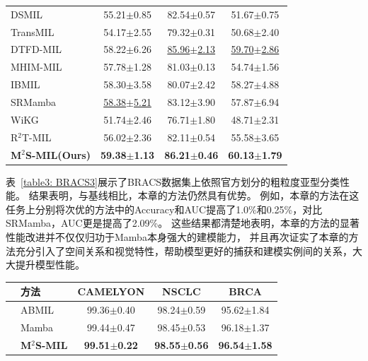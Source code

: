 {\begin{xltabular}{\textwidth}{XCCC}
  DSMIL~\cite{li2021dual}          & 55.21$\pm$0.85 & 82.54$\pm$0.57 & 51.67$\pm$0.75\\
  TransMIL~\cite{shao2021transmil} & 54.17$\pm$2.55 & 79.32$\pm$0.31 & 50.68$\pm$2.40  \\
  DTFD-MIL~\cite{zhang2022dtfd}    & 58.22$\pm$6.26 &\underline{85.96$\pm$2.13} &\underline{59.70$\pm$2.86} \\
  MHIM-MIL~\cite{tang2023multiple}    &57.78$\pm$1.28 & 81.03$\pm$0.13 &54.74$\pm$1.56 \\
  IBMIL~\cite{lin2023interventional}    & 58.30$\pm$3.58 & 80.07$\pm$2.42 & 58.27$\pm$4.88\\
  SRMamba ~\cite{yang2024mambamil}& \underline{58.38$\pm$5.21}&83.12$\pm$3.90 & 57.87$\pm$6.94 \\
  WiKG ~\cite{li2024dynamic}& 51.74$\pm$2.46 & 76.71$\pm$1.80 & 48.71$\pm$2.31 \\
  R$^2$T-MIL ~\cite{tang2024feature}& 56.02$\pm$2.36 &82.11$\pm$0.54 & 55.58$\pm$3.65  \\
  \textbf{M$^2$S-MIL(Ours)} &\textbf{59.38$\pm$1.13} &\textbf{86.21$\pm$0.46} & \textbf{60.13$\pm$1.79}\\

\end{xltabular}}




表~\ref{table3: BRACS3}展示了BRACS数据集上依照官方划分的粗粒度亚型分类性能。
结果表明，与基线相比，本章的方法仍然具有优势。
例如，本章的方法在这任务上分别将次优的方法中的Accuracy和AUC提高了1.0\%和0.25\%，对比SRMamba，AUC更是提高了2.09\%。
这些结果都清楚地表明，本章的方法的显著性能改进并不仅仅归功于Mamba本身强大的建模能力，
并且再次证实了本章的方法充分引入了空间关系和视觉特性，帮助模型更好的捕获和建模实例间的关系，大大提升模型性能。

\begin{table}[h!]
  \large    %
  \centering
  \begin{tabularx}{\textwidth}{clCCC}
    \toprule
    &方法  & CAMELYON& NSCLC&BRCA\\ \midrule
    &
    ABMIL~\cite{ilse2018attention} &  99.36$\pm$0.40 & 98.24$\pm$0.59 & 95.62$\pm$1.84   \\
    &Mamba ~\cite{gu2023mamba} & 99.44$\pm$0.47 & 98.45$\pm$0.53 & 96.18$\pm$1.37  \\
    &\textbf{M$^2$S-MIL}  &  \textbf{99.51$\pm$0.22} & \textbf{98.55$\pm$0.56} & \textbf{96.54$\pm$1.58}  \\    \bottomrule
  \end{tabularx}
  \label{table3: UNI}
\end{table}

